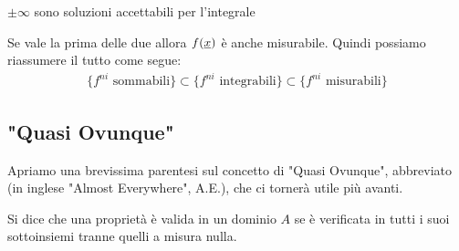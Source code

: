 $\pm \infty$ sono soluzioni accettabili per l'integrale

Se vale la prima delle due allora $f(\underline{x})$ è anche misurabile. Quindi possiamo riassumere il tutto come segue:
\begin{align}
	\{ f^{ni} \text{ sommabili}  \} \subset \{  f^{ni} \text{ integrabili}  \}  \subset \{  f^{ni} \text{ misurabili}  \}
\end{align}

\begin{figure}[!htb]
\end{figure}


\newpage

\subsection{"Quasi Ovunque"}

Apriamo una brevissima parentesi sul concetto di "Quasi Ovunque", abbreviato \qo (in inglese "Almost Everywhere", A.E.), che ci tornerà utile più avanti.

Si dice che una proprietà è valida \qo in un dominio $A$ se è verificata in tutti i suoi sottoinsiemi tranne quelli a misura nulla.

\begin{figure}[!htb]
\end{figure}

